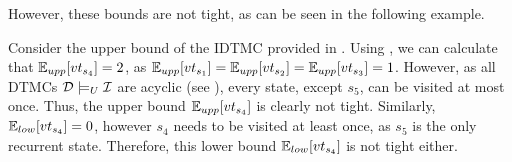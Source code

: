 

However, these bounds are not tight, as can be seen in the following example. 
\begin{example}\label{ex:loose-bounds}
    Consider the upper bound of the IDTMC provided in . Using , we can calculate that $\mathbb{E}_{upp}[vt_{s_4}] = 2$, as $\mathbb{E}_{upp}[vt_{s_1}]= \mathbb{E}_{upp}[vt_{s_2}] = \mathbb{E}_{upp}[vt_{s_3}] =  1$.
    However, as all DTMCs $\mathcal{D} \models_U \mathcal{I}$ are acyclic (see ), every state, except $s_5$, can be visited at most once. Thus, the upper bound $\mathbb{E}_{upp}[vt_{s_4}]$ is clearly not tight. Similarly, $\mathbb{E}_{low}[vt_{s_4}] = 0$, however $s_4$ needs to be visited at least once, as $s_5$ is the only recurrent state. Therefore, this lower bound $\mathbb{E}_{low}[vt_{s_4}]$ is not tight either.    
\end{example}

